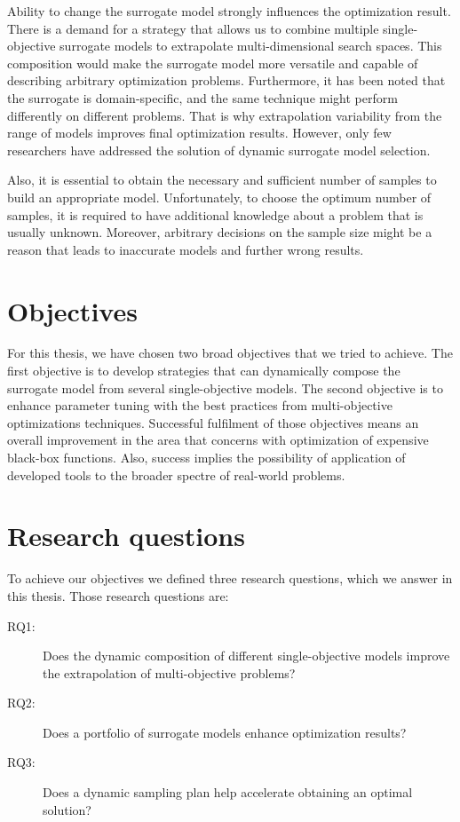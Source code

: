     Ability to change the surrogate model strongly influences the optimization result. There is a demand for a strategy that allows us to combine multiple single-objective surrogate models to extrapolate multi-dimensional search spaces. This composition would make the surrogate model more versatile and capable of describing arbitrary optimization problems. Furthermore, it has been noted that the surrogate is domain-specific, and the same technique might perform differently on different problems. That is why extrapolation variability from the range of models improves final optimization results. However, only few researchers have addressed the solution of dynamic surrogate model selection. 

    Also, it is essential to obtain the necessary and sufficient number of samples to build an appropriate model. Unfortunately, to choose the optimum number of samples, it is required to have additional knowledge about a problem that is usually unknown. Moreover, arbitrary decisions on the sample size might be a reason that leads to inaccurate models and further wrong results.


\section{Objectives}
For this thesis, we have chosen two broad objectives that we tried to achieve.
The first objective is to develop strategies that can dynamically compose the surrogate model from several single-objective models.
The second objective is to enhance parameter tuning with the best practices from multi-objective optimizations techniques. Successful fulfilment of those objectives means an overall improvement in the area that concerns with optimization of expensive black-box functions. Also, success implies the possibility of application of developed tools to the broader spectre of real-world problems. 

\section{Research questions}
\label{rq}
To achieve our objectives we defined three research questions, which we answer in this thesis.
Those research questions are:
\begin{description} 
    \item[RQ1:]\label{RQ1} Does the dynamic composition of different single-objective models improve the extrapolation of multi-objective problems?
    \item[RQ2:]\label{RQ2} Does a portfolio of surrogate models enhance optimization results?
    \item[RQ3:]\label{RQ3} Does a dynamic sampling plan help accelerate obtaining an optimal solution?
\end{description}

